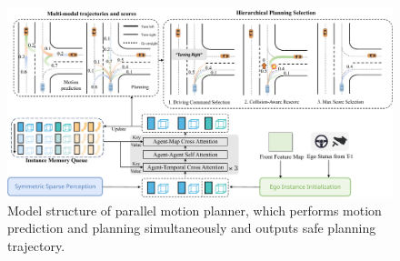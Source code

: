 \begin{figure}[htbp]
  \centering
  \includegraphics[width=0.83\linewidth]{Figures/motion_planner_.pdf}
  \caption{Model structure of parallel motion planner, which performs motion prediction and planning simultaneously and outputs safe planning trajectory.}
  \label{fig:motion_planner}
\end{figure}